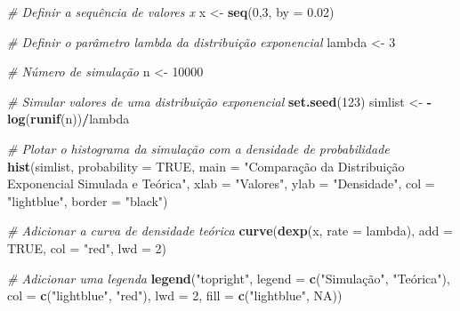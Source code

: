 \documentclass[
]{book}
\newenvironment{Shaded}{\begin{snugshade}}{\end{snugshade}}
\newcommand{\AttributeTok}[1]{\textcolor[rgb]{0.13,0.29,0.53}{#1}}
\newcommand{\CommentTok}[1]{\textcolor[rgb]{0.56,0.35,0.01}{\textit{#1}}}
\newcommand{\ConstantTok}[1]{\textcolor[rgb]{0.56,0.35,0.01}{#1}}
\newcommand{\DecValTok}[1]{\textcolor[rgb]{0.00,0.00,0.81}{#1}}
\newcommand{\FloatTok}[1]{\textcolor[rgb]{0.00,0.00,0.81}{#1}}
\newcommand{\FunctionTok}[1]{\textcolor[rgb]{0.13,0.29,0.53}{\textbf{#1}}}
\newcommand{\NormalTok}[1]{#1}
\newcommand{\OtherTok}[1]{\textcolor[rgb]{0.56,0.35,0.01}{#1}}
\newcommand{\SpecialCharTok}[1]{\textcolor[rgb]{0.81,0.36,0.00}{\textbf{#1}}}
\newcommand{\StringTok}[1]{\textcolor[rgb]{0.31,0.60,0.02}{#1}}
\begin{document}
\begin{Shaded}
\begin{Highlighting}[]
\CommentTok{\# Definir a sequência de valores x}
\NormalTok{x }\OtherTok{\textless{}{-}} \FunctionTok{seq}\NormalTok{(}\DecValTok{0}\NormalTok{,}\DecValTok{3}\NormalTok{, }\AttributeTok{by =} \FloatTok{0.02}\NormalTok{)}

\CommentTok{\# Definir o parâmetro lambda da distribuição exponencial}
\NormalTok{lambda }\OtherTok{\textless{}{-}} \DecValTok{3}

\CommentTok{\# Número de simulação}
\NormalTok{n }\OtherTok{\textless{}{-}} \DecValTok{10000}

\CommentTok{\# Simular valores de uma distribuição exponencial}
\FunctionTok{set.seed}\NormalTok{(}\DecValTok{123}\NormalTok{)}
\NormalTok{simlist }\OtherTok{\textless{}{-}} \SpecialCharTok{{-}}\FunctionTok{log}\NormalTok{(}\FunctionTok{runif}\NormalTok{(n))}\SpecialCharTok{/}\NormalTok{lambda}

\CommentTok{\# Plotar o histograma da simulação com a densidade de probabilidade}
\FunctionTok{hist}\NormalTok{(simlist, }\AttributeTok{probability =} \ConstantTok{TRUE}\NormalTok{, }\AttributeTok{main =} \StringTok{"Comparação da Distribuição Exponencial Simulada e Teórica"}\NormalTok{,}
     \AttributeTok{xlab =} \StringTok{"Valores"}\NormalTok{, }\AttributeTok{ylab =} \StringTok{"Densidade"}\NormalTok{, }\AttributeTok{col =} \StringTok{"lightblue"}\NormalTok{, }\AttributeTok{border =} \StringTok{"black"}\NormalTok{)}

\CommentTok{\# Adicionar a curva de densidade teórica}
\FunctionTok{curve}\NormalTok{(}\FunctionTok{dexp}\NormalTok{(x, }\AttributeTok{rate =}\NormalTok{ lambda), }\AttributeTok{add =} \ConstantTok{TRUE}\NormalTok{, }\AttributeTok{col =} \StringTok{"red"}\NormalTok{, }\AttributeTok{lwd =} \DecValTok{2}\NormalTok{)}

\CommentTok{\# Adicionar uma legenda}
\FunctionTok{legend}\NormalTok{(}\StringTok{"topright"}\NormalTok{, }\AttributeTok{legend =} \FunctionTok{c}\NormalTok{(}\StringTok{"Simulação"}\NormalTok{, }\StringTok{"Teórica"}\NormalTok{), }\AttributeTok{col =} \FunctionTok{c}\NormalTok{(}\StringTok{"lightblue"}\NormalTok{, }\StringTok{"red"}\NormalTok{), }\AttributeTok{lwd =} \DecValTok{2}\NormalTok{, }\AttributeTok{fill =} \FunctionTok{c}\NormalTok{(}\StringTok{"lightblue"}\NormalTok{, }\ConstantTok{NA}\NormalTok{))}
\end{Highlighting}
\end{Shaded}
\end{document}
